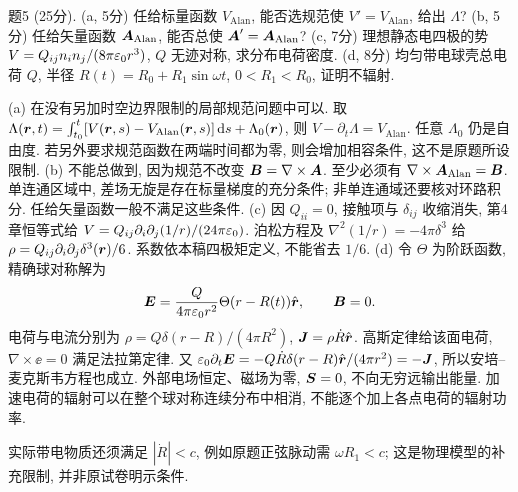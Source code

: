 \begin{exercise}
题5 (25分). (a, 5分) 任给标量函数 $V_\mathrm{Alan}$, 能否选规范使 $V'=V_\mathrm{Alan}$, 给出 $\Lambda$? (b, 5分) 任给矢量函数 $\boldsymbol{A}_\mathrm{Alan}$, 能否总使 $\boldsymbol{A}'=\boldsymbol{A}_\mathrm{Alan}$? (c, 7分) 理想静态电四极的势 $V=Q_{ij}n_in_j/(8\pi\varepsilon_0 r^3)$, $Q$ 无迹对称, 求分布电荷密度. (d, 8分) 均匀带电球壳总电荷 $Q$, 半径 $R(t)=R_0+R_1\sin\omega t$, $0<R_1<R_0$, 证明不辐射.
\end{exercise}
\begin{solution}
(a) 在没有另加时空边界限制的局部规范问题中可以. 取 $\Lambda(\boldsymbol{r},t)=\int_{t_0}^t[V(\boldsymbol{r},s)-V_\mathrm{Alan}(\boldsymbol{r},s)]\,\mathrm d s+\Lambda_0(\boldsymbol{r})$, 则 $V-\partial_t\Lambda=V_\mathrm{Alan}$. 任意 $\Lambda_0$ 仍是自由度. 若另外要求规范函数在两端时间都为零, 则会增加相容条件, 这不是原题所设限制.
(b) 不能总做到, 因为规范不改变 $\boldsymbol{B}=\nabla\times\boldsymbol{A}$. 至少必须有 $\nabla\times\boldsymbol{A}_\mathrm{Alan}=\boldsymbol{B}$. 单连通区域中, 差场无旋是存在标量梯度的充分条件; 非单连通域还要核对环路积分. 任给矢量函数一般不满足这些条件.
(c) 因 $Q_{ii}=0$, 接触项与 $\delta_{ij}$ 收缩消失, 第4章恒等式给 $V=Q_{ij}\partial_i\partial_j(1/r)/(24\pi\varepsilon_0)$. 泊松方程及 $\nabla^2(1/r)=-4\pi\delta^3$ 给
$\rho=Q_{ij}\partial_i\partial_j\delta^3(\boldsymbol{r})/6$. 系数依本稿四极矩定义, 不能省去 $1/6$.
(d) 令 $\Theta$ 为阶跃函数, 精确球对称解为
\[
\boldsymbol{E}=\frac Q{4\pi\varepsilon_0 r^2}\Theta(r-R(t))\hat{\boldsymbol{r}},\qquad \boldsymbol{B}=0.
\]
电荷与电流分别为 $\rho=Q\delta(r-R)/(4\pi R^2)$, $\boldsymbol{J}=\rho\dot R\hat{\boldsymbol{r}}$. 高斯定律给该面电荷, $\nabla\times\ee=0$ 满足法拉第定律. 又 $\varepsilon_0\partial_t\boldsymbol{E}=-Q\dot R\delta(r-R)\hat{\boldsymbol{r}}/(4\pi r^2)=-\boldsymbol{J}$, 所以安培--麦克斯韦方程也成立. 外部电场恒定、磁场为零, $\boldsymbol{S}=0$, 不向无穷远输出能量. 加速电荷的辐射可以在整个球对称连续分布中相消, 不能逐个加上各点电荷的辐射功率.
\end{solution}

实际带电物质还须满足 $|\dot R|<c$, 例如原题正弦脉动需 $\omega R_1<c$; 这是物理模型的补充限制, 并非原试卷明示条件.
